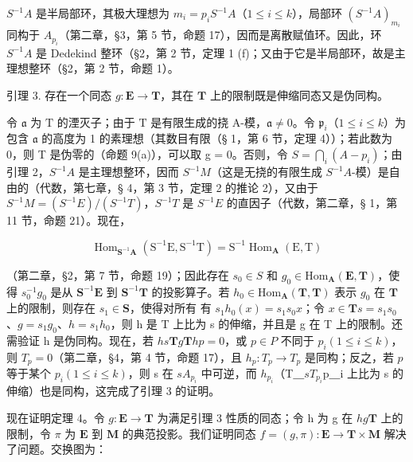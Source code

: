 \(S^{-1}A\) 是半局部环，其极大理想为 \(m_{i} = p_{i}S^{-1}A\)（\(1 \leqslant i \leqslant k\)），局部环 \((S^{-1}A)_{m_{i}}\) 同构于 \(A_{p_{i}}\)（第二章，§3，第 5 节，命题 17），因而是离散赋值环。因此，环 \(S^{-1}A\) 是 Dedekind 整环（§2，第 2 节，定理 1 (f)；又由于它是半局部环，故是主理想整环（§2，第 2 节，命题 1）。

引理 3. 存在一个同态 \(g: \mathbf{E} \to \mathbf{T}\)，其在 \(\mathbf{T}\) 上的限制既是伸缩同态又是伪同构。

令 \(\mathfrak{a}\) 为 \(\mathrm{T}\) 的湮灭子；由于 \(\mathrm{T}\) 是有限生成的挠 A-模，\(\mathfrak{a} \neq 0\)。令 \(\mathfrak{p}_i\)（\(1 \leqslant i \leqslant k\)）为包含 \(\mathfrak{a}\) 的高度为 1 的素理想（其数目有限（§ 1，第 6 节，定理 4））；若此数为 0，则 T 是伪零的（命题 9(a)），可以取 g = 0。否则，令 \(S = \bigcap_{i} (A - p_{i})\)；由引理 2，\(S^{-1}A\) 是主理想整环，因而 \(S^{-1}M\)（这是无挠的有限生成 \(S^{-1}A\)-模）是自由的（代数，第七章，§ 4，第 3 节，定理 2 的推论 2），又由于 \(S^{-1}M = (S^{-1}E)/(S^{-1}T)\)，\(S^{-1}T\) 是 \(S^{-1}E\) 的直因子（代数，第二章，§ 1，第 11 节，命题 21）。现在，

\[
\operatorname{Hom} _ {\mathbf {S} ^ {- 1} \mathbf {A}} (\mathrm{S} ^ {- 1} \mathrm{E}, \mathrm{S} ^ {- 1} \mathrm{T}) = \mathrm{S} ^ {- 1} \operatorname{Hom} _ {\mathbf {A}} (\mathrm{E}, \mathrm{T})
\]

（第二章，§2，第 7 节，命题 19）；因此存在 \(s_0 \in S\) 和 \(g_0 \in \mathrm{Hom}_{\mathbf{A}}(\mathbf{E}, \mathbf{T})\)，使得 \(s_0^{-1}g_0\) 是从 \(\mathbf{S}^{-1}\mathbf{E}\) 到 \(\mathbf{S}^{-1}\mathbf{T}\) 的投影算子。若 \(h_0 \in \mathrm{Hom}_{\mathbf{A}}(\mathbf{T}, \mathbf{T})\) 表示 \(g_0\) 在 \(\mathbf{T}\) 上的限制，则存在 \(s_1 \in \mathbf{S}\)，使得对所有  有 \(s_1h_0(x) = s_1s_0x\)；令 \(x \in \mathbf{T}\)\(s = s_1s_0\)、\(g = s_1g_0\)、\(h = s_1h_0\)，则 h 是 T 上比为 s 的伸缩，并且是 g 在 T 上的限制。还需验证 h 是伪同构。现在，若 \(h\)\(s\)\(\mathbf{T}\)\(g\)\(\mathbf{T}\)\(h\)\(p = 0\)，或 \(p \in P\) 不同于 \(p_i (1 \leqslant i \leqslant k)\)，则 \(T_p = 0\)（第二章，§4，第 4 节，命题 17），且 \(h_p: T_p \to T_p\) 是同构；反之，若 \(p\) 等于某个 \(p_i (1 \leqslant i \leqslant k)\)，则 s 在 \(s\)\(A_{p_i}\) 中可逆，而 \(h_{p_i}\)（T＿\(s\)\(T_{p_i}\)p＿i 上比为 s 的伸缩）也是同构，这完成了引理 3 的证明。

现在证明定理 4。令 \(g: \mathbf{E} \to \mathbf{T}\) 为满足引理 3 性质的同态；令 h 为 g 在 \(h\)\(g\)\(\mathbf{T}\) 上的限制，令 \(\pi\) 为 \(\mathbf{E}\) 到 \(\mathbf{M}\) 的典范投影。我们证明同态 \(f = (g, \pi): \mathbf{E} \to \mathbf{T} \times \mathbf{M}\) 解决了问题。交换图为：

